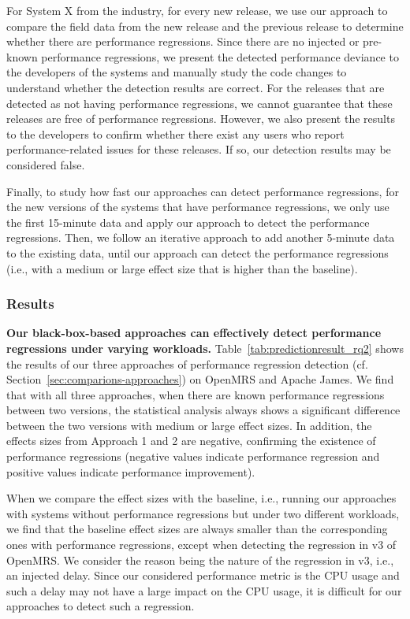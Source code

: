 For System X from the industry, for every new release, we use our approach to compare the field data from the new release and the previous release to determine whether there are performance regressions. Since there are no injected or pre-known performance regressions, we present the detected performance deviance to the developers of the systems and manually study the code changes to understand whether the detection results are correct. For the releases that are detected as not having performance regressions, we cannot guarantee that these releases are free of performance regressions. However, we also present the results to the developers to confirm whether there exist any users who report performance-related issues for these releases. If so, our detection results may be considered false.

Finally, to study how fast our approaches can detect performance regressions, for the new versions of the systems that have performance regressions, we only use the first 15-minute data and apply our approach to detect the performance regressions. Then, we follow an iterative approach to add another 5-minute data to the existing data, until our approach can detect the performance regressions (i.e., with a medium or large effect size that is higher than the baseline). 

\subsubsection*{Results}

\noindent\textbf{Our black-box-based approaches can effectively detect performance regressions under varying workloads.}
Table~\ref{tab:predictionresult_rq2} shows the results of our three approaches of performance regression detection (cf. Section~\ref{sec:comparions-approaches}) on OpenMRS and Apache James. We find that with all three approaches, when there are known performance regressions between two versions, the statistical analysis always shows a significant difference between the two versions with medium or large effect sizes. In addition, the effects sizes from Approach 1 and 2 are negative, confirming the existence of performance regressions (negative values indicate performance regression and positive values indicate performance improvement). 

When we compare the effect sizes with the baseline, i.e., running our approaches with systems without performance regressions but under two different workloads, we find that the baseline effect sizes are always smaller than the corresponding ones with performance regressions, except when detecting the regression in v3 of OpenMRS. We consider the reason being the nature of the regression in v3, i.e., an injected delay. Since our considered performance metric is the CPU usage and such a delay may not have a large impact on the CPU usage, it is difficult for our approaches to detect such a regression. 


